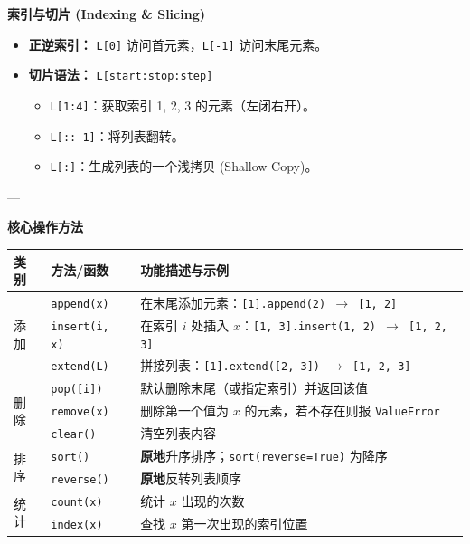 \documentclass{article}
\begin{document}
\textbf{索引与切片 (Indexing \& Slicing)}

\begin{itemize}
    \item \textbf{正逆索引：} \texttt{L[0]} 访问首元素，\texttt{L[-1]} 访问末尾元素。
    \item \textbf{切片语法：} \texttt{L[start:stop:step]}
    \begin{itemize}
        \item \texttt{L[1:4]}：获取索引 1, 2, 3 的元素（左闭右开）。
        \item \texttt{L[::-1]}：将列表翻转。
        \item \texttt{L[:]}：生成列表的一个浅拷贝 (Shallow Copy)。
    \end{itemize}
\end{itemize}

---

\textbf{核心操作方法}
\begin{table}[h]
\centering
\begin{tabular}{|l|l|l|}
\hline
\textbf{类别} & \textbf{方法/函数} & \textbf{功能描述与示例} \\ \hline
\multirow{3}{*}{添加} & \texttt{append(x)} & 在末尾添加元素：\texttt{[1].append(2) $\rightarrow$ [1, 2]} \\ \cline{2-3} 
 & \texttt{insert(i, x)} & 在索引 $i$ 处插入 $x$：\texttt{[1, 3].insert(1, 2) $\rightarrow$ [1, 2, 3]} \\ \cline{2-3} 
 & \texttt{extend(L)} & 拼接列表：\texttt{[1].extend([2, 3]) $\rightarrow$ [1, 2, 3]} \\ \hline
\multirow{3}{*}{删除} & \texttt{pop([i])} & 默认删除末尾（或指定索引）并返回该值 \\ \cline{2-3} 
 & \texttt{remove(x)} & 删除第一个值为 $x$ 的元素，若不存在则报 \texttt{ValueError} \\ \cline{2-3} 
 & \texttt{clear()} & 清空列表内容 \\ \hline
\multirow{2}{*}{排序} & \texttt{sort()} & \textbf{原地}升序排序；\texttt{sort(reverse=True)} 为降序 \\ \cline{2-3} 
 & \texttt{reverse()} & \textbf{原地}反转列表顺序 \\ \hline
\multirow{2}{*}{统计} & \texttt{count(x)} & 统计 $x$ 出现的次数 \\ \cline{2-3} 
 & \texttt{index(x)} & 查找 $x$ 第一次出现的索引位置 \\ \hline
\end{tabular}
\end{table}
\end{document}
